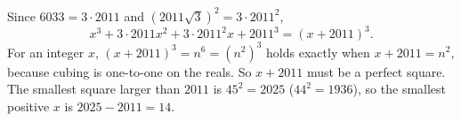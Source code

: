 Since $6033=3\cdot2011$ and $\left(2011\sqrt3\right)^2=3\cdot2011^2$,
\[
x^3+3\cdot2011x^2+3\cdot2011^2x+2011^3=(x+2011)^3 .
\]
For an integer $x$, $(x+2011)^3=n^6=\left(n^2\right)^3$ holds exactly when $x+2011=n^2$, because cubing is one-to-one on the reals. So $x+2011$ must be a perfect square. The smallest square larger than $2011$ is $45^2=2025$ ($44^2=1936$), so the smallest positive $x$ is $2025-2011=\boxed{14}$.

